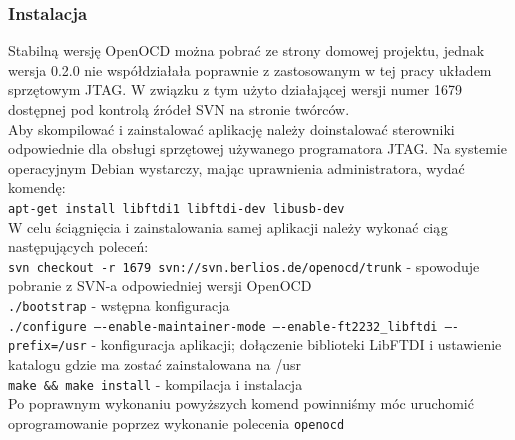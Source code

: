 \documentclass[a4paper,12pt]{book}
\begin{document}
				\subsubsection{Instalacja}
					Stabilną wersję OpenOCD można pobrać ze strony domowej projektu, jednak wersja 0.2.0 nie współdziałała poprawnie z zastosowanym w tej pracy układem sprzętowym JTAG. W związku z tym użyto działającej wersji numer 1679 dostępnej pod kontrolą źródeł SVN na stronie twórców.\\
					Aby skompilować i zainstalować aplikację należy doinstalować sterowniki odpowiednie dla obsługi sprzętowej używanego programatora JTAG. Na systemie operacyjnym Debian wystarczy, mając uprawnienia administratora, wydać komendę:\\
					\texttt{apt-get install libftdi1 libftdi-dev libusb-dev}\\
					W celu ściągnięcia i zainstalowania samej aplikacji należy wykonać ciąg następujących poleceń:\\
					\texttt{svn checkout -r 1679 svn://svn.berlios.de/openocd/trunk} - spowoduje pobranie z SVN-a odpowiedniej wersji OpenOCD\\
					\texttt{./bootstrap} - wstępna konfiguracja\\
					\texttt{./configure ----enable-maintainer-mode ----enable-ft2232\_libftdi ----prefix=/usr} - konfiguracja aplikacji; dołączenie biblioteki LibFTDI i ustawienie katalogu gdzie ma zostać zainstalowana na /usr\\
					\texttt{make \&\& make install} - kompilacja i instalacja\\
					Po poprawnym wykonaniu powyższych komend powinniśmy móc uruchomić oprogramowanie poprzez wykonanie polecenia \texttt{openocd}
					
\end{document}
